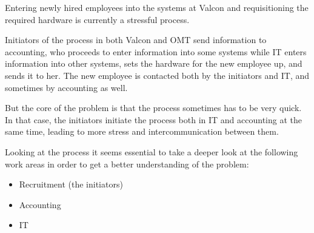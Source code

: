 Entering newly hired employees into the systems at Valcon and requisitioning the required hardware is currently a stressful process.

Initiators of the process in both Valcon and OMT send information to accounting, who proceeds to enter information into some systems while IT enters information into other systems, sets the hardware for the new employee up, and sends it to her.
The new employee is contacted both by the initiators and IT, and sometimes by accounting as well.

But the core of the problem is that the process sometimes has to be very quick.
In that case, the initiators initiate the process both in IT and accounting at the same time, leading to more stress and intercommunication between them.

Looking at the process it seems essential to take a deeper look at the following work areas in order to get a better understanding of the problem:
\begin{itemize}
\item Recruitment (the initiators)
\item Accounting
\item IT
\end{itemize}